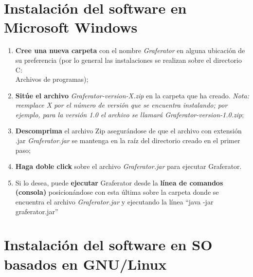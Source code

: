 \documentclass{book}
\begin{document}
\section{Instalación del software en Microsoft Windows}

\begin{enumerate}
	\itemsep=8pt \topsep=0pt \partopsep=0pt \parskip=0pt \parsep=0pt
	
	\item \textbf{Cree una nueva carpeta} con el nombre \textit{Graferator} en alguna ubicación de su preferencia (por lo general las instalaciones se realizan sobre el directorio C:\\Archivos de programas);

	\item \textbf{Sitúe el archivo} \textit{Graferator-version-X.zip} en la carpeta que ha creado. \textit{Nota: reemplace X por el número de versión que se encuentra instalando; por ejemplo, para la versión 1.0 el archivo se llamará Graferator-version-1.0.zip};

	\item \textbf{Descomprima} el archivo Zip asegurándose de que el archivo con extensión .jar \textit{Graferator.jar} se mantenga en la raíz del directorio creado en el primer paso;

	\item \textbf{Haga doble click} sobre el archivo \textit{Graferator.jar} para ejecutar Graferator.

	\item Si lo desea, puede \textbf{ejecutar} Graferator desde la \textbf{línea de comandos (consola)} posicionándose con esta última sobre la carpeta donde se encuentra el archivo \textit{Graferator.jar} y ejecutando la línea ``{\ttfamily\footnotesize java -jar graferator.jar}''

\end{enumerate}
\bigskip



\section{Instalación del software en SO basados en GNU/Linux}
\end{document}
